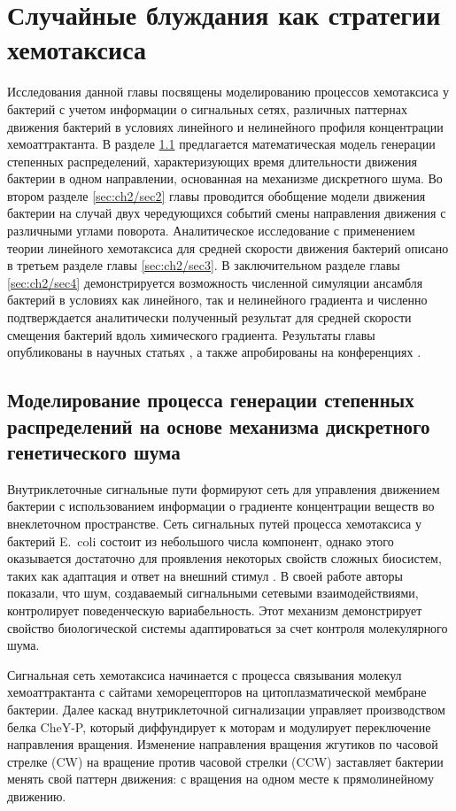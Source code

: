 \chapter{Случайные блуждания как стратегии хемотаксиса}\label{ch:ch2}

Исследования данной главы посвящены моделированию процессов хемотаксиса у бактерий с учетом информации о сигнальных сетях, различных паттернах движения бактерий в условиях линейного и нелинейного профиля концентрации хемоаттрактанта. В разделе \cref{sec:ch2/sec1} предлагается математическая модель генерации степенных распределений, характеризующих время длительности движения бактерии в одном направлении, основанная на механизме дискретного шума. Во втором разделе \cref{sec:ch2/sec2} главы проводится обобщение модели движения бактерии на случай двух чередующихся событий смены направления движения с различными углами поворота. Аналитическое исследование с применением теории линейного хемотаксиса для средней скорости движения бактерий описано в третьем разделе главы \cref{sec:ch2/sec3}. В заключительном разделе главы \cref{sec:ch2/sec4} демонстрируется возможность численной симуляции ансамбля бактерий в условиях как линейного, так и нелинейного градиента и численно подтверждается аналитически полученный результат для средней скорости смещения бактерий вдоль химического градиента. Результаты главы опубликованы в научных статьях \cite{bib1,bib2}, а также апробированы на конференциях \cite{confbib5,confbib6}.  

\section{Моделирование процесса генерации степенных распределений на основе механизма дискретного генетического шума}\label{sec:ch2/sec1}
Внутриклеточные сигнальные пути формируют сеть для управления движением бактерии с использованием информации о градиенте концентрации веществ во внеклеточном пространстве. Сеть сигнальных путей процесса хемотаксиса у бактерий E.~coli состоит из небольшого числа компонент, однако этого оказывается достаточно для проявления некоторых свойств сложных биосистем, таких как адаптация и ответ на внешний стимул \cite{korobkova_molecular_2004}. В своей работе авторы показали, что шум, создаваемый сигнальными сетевыми взаимодействиями, контролирует поведенческую вариабельность. Этот механизм демонстрирует свойство биологической системы адаптироваться за счет контроля молекулярного шума. 

Сигнальная сеть хемотаксиса начинается с процесса связывания молекул хемоаттрактанта с сайтами хеморецепторов на цитоплазматической мембране бактерии. Далее каскад внутриклеточной сигнализации управляет производством белка CheY-P, который диффундирует к моторам и модулирует переключение направления вращения. Изменение направления вращения жгутиков по часовой стрелке (CW) на вращение против часовой стрелки (CCW) заставляет бактерии менять свой паттерн движения: с вращения на одном месте к прямолинейному движению.

